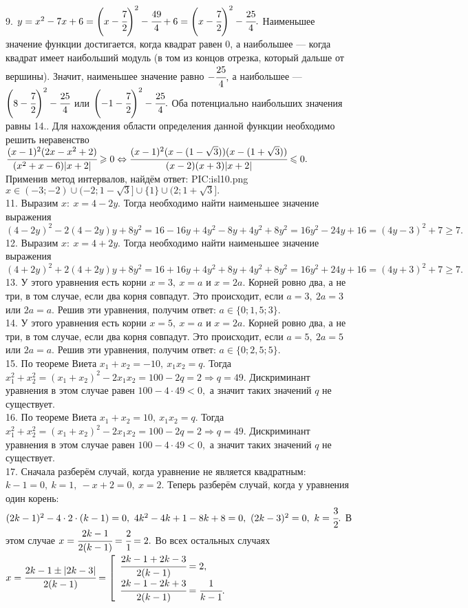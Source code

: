 9. $y=x^2-7x+6=\left(x-\cfrac{7}{2}\right)^2-\cfrac{49}{4}+6=\left(x-\cfrac{7}{2}\right)^2-\cfrac{25}{4}.$ Наименьшее значение функции достигается, когда квадрат равен 0, а наибольшее --- когда квадрат имеет наибольший модуль (в том из концов отрезка, который дальше от вершины). Значит, наименьшее значение равно $-\cfrac{25}{4},$ а наибольшее ---
$\left(8-\cfrac{7}{2}\right)^2-\cfrac{25}{4}$ или $\left(-1-\cfrac{7}{2}\right)^2-\cfrac{25}{4}.$ Оба потенциально наибольших значения равны 14.\newpage{}. Для нахождения области определения данной функции необходимо решить неравенство\\ $\cfrac{(x-1)^2(2x-x^2+2)}{(x^2+x-6)|x+2|}\geqslant0\Leftrightarrow
\cfrac{(x-1)^2(x-(1-\sqrt{3}))(x-(1+\sqrt{3}))}{(x-2)(x+3)|x+2|}\leqslant0.$ Применив метод интервалов, найдём ответ:
{{PIC:isl10.png}}
$x\in(-3;-2)\cup(-2;1-\sqrt{3}]\cup\{1\}\cup(2;1+\sqrt{3}].$\\
11. Выразим $x:\ x=4-2y.$ Тогда необходимо найти наименьшее значение выражения $(4-2y)^2-2(4-2y)y+8y^2=16-16y+4y^2-8y+4y^2+8y^2=
16y^2-24y+16=(4y-3)^2+7\geqslant7.$\\
12. Выразим $x:\ x=4+2y.$ Тогда необходимо найти наименьшее значение выражения $(4+2y)^2+2(4+2y)y+8y^2=16+16y+4y^2+8y+4y^2+8y^2=
16y^2+24y+16=(4y+3)^2+7\geqslant7.$\\
13. У этого уравнения есть корни $x=3,\ x=a$ и $x=2a.$ Корней ровно два, а не три, в том случае, если два корня совпадут. Это происходит, если $a=3,\ 2a=3$ или $2a=a.$ Решив эти уравнения, получим ответ: $a\in\{0; 1,5;3\}.$\\
14. У этого уравнения есть корни $x=5,\ x=a$ и $x=2a.$ Корней ровно два, а не три, в том случае, если два корня совпадут. Это происходит, если $a=5,\ 2a=5$ или $2a=a.$ Решив эти уравнения, получим ответ: $a\in\{0; 2,5;5\}.$\\
15. По теореме Виета $x_1+x_2=-10,\ x_1x_2=q.$ Тогда $x_1^2+x_2^2=(x_1+x_2)^2-2x_1x_2=100-2q=2\Rightarrow q=49.$ Дискриминант уравнения в этом случае равен $100-4\cdot49<0,$ а значит таких значений $q$ не существует.\\
16. По теореме Виета $x_1+x_2=10,\ x_1x_2=q.$ Тогда $x_1^2+x_2^2=(x_1+x_2)^2-2x_1x_2=100-2q=2\Rightarrow q=49.$ Дискриминант уравнения в этом случае равен $100-4\cdot49<0,$ а значит таких значений $q$ не существует.\\
17. Сначала разберём случай, когда уравнение не является квадратным: $k-1=0,\ k=1,\ -x+2=0,\ x=2.$ Теперь разберём случай, когда у уравнения один корень:
$(2k-1)^2-4\cdot2\cdot(k-1)=0,\ 4k^2-4k+1-8k+8=0,\ (2k-3)^2=0,\ k=\cfrac{3}{2}.$ В этом случае $x=\cfrac{2k-1}{2(k-1)}=\cfrac{2}{1}=2.$ Во всех остальных случаях $x=\cfrac{2k-1\pm|2k-3|}{2(k-1)}=\left[\begin{array}{l}\cfrac{2k-1+2k-3}{2(k-1)}=2,\\ \cfrac{2k-1-2k+3}{2(k-1)}=\cfrac{1}{k-1}.\end{array}\right.$\\
